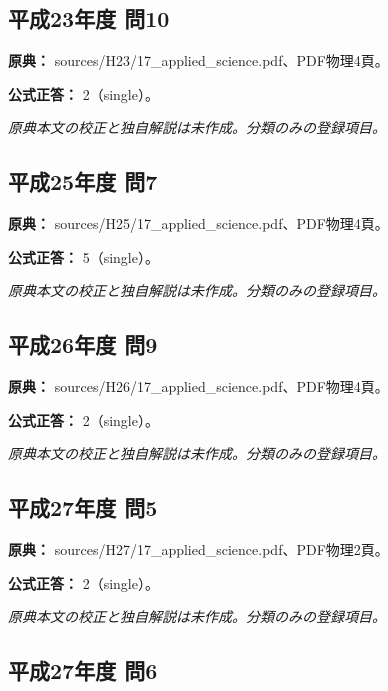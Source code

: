 \subsection{平成23年度 問10}
\label{q:h23-reg-applied-10}

\noindent\textbf{原典：} sources/H23/17\_applied\_science.pdf、PDF物理4頁。

\textbf{公式正答：} 2（single）。

\par\textit{原典本文の校正と独自解説は未作成。分類のみの登録項目。}

\subsection{平成25年度 問7}
\label{q:h25-reg-applied-07}

\noindent\textbf{原典：} sources/H25/17\_applied\_science.pdf、PDF物理4頁。

\textbf{公式正答：} 5（single）。

\par\textit{原典本文の校正と独自解説は未作成。分類のみの登録項目。}

\subsection{平成26年度 問9}
\label{q:h26-reg-applied-09}

\noindent\textbf{原典：} sources/H26/17\_applied\_science.pdf、PDF物理4頁。

\textbf{公式正答：} 2（single）。

\par\textit{原典本文の校正と独自解説は未作成。分類のみの登録項目。}

\subsection{平成27年度 問5}
\label{q:h27-reg-applied-05}

\noindent\textbf{原典：} sources/H27/17\_applied\_science.pdf、PDF物理2頁。

\textbf{公式正答：} 2（single）。

\par\textit{原典本文の校正と独自解説は未作成。分類のみの登録項目。}

\subsection{平成27年度 問6}
\label{q:h27-reg-applied-06}

